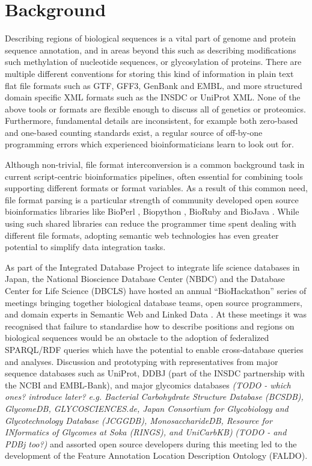 \section*{Background}
Describing regions of biological sequences is a vital part of genome and protein sequence
annotation, and in areas beyond this such as describing modifications such methylation
of nucleotide sequences, or glycosylation of proteins.
There are multiple different conventions for storing this kind of information in
plain text flat file formats such as GTF, GFF3, GenBank and EMBL,
and more structured domain specific XML formats such as the INSDC or UniProt XML.
None of the above tools or formats are flexible enough to discuss all of genetics or proteomics. 
Furthermore, fundamental details are inconsistent, for example both zero-based and
one-based counting standards exist, a regular source of off-by-one programming
errors which experienced bioinformaticians learn to look out for.

Although non-trivial, file format interconversion is a common background task
in current script-centric bioinformatics pipelines, often essential for combining
tools supporting different formats or format variables.
As a result of this common need, file format parsing is a particular strength of
community developed open source bioinformatics libraries like BioPerl
\cite{BioPerl2002}, Biopython \cite{Biopython2009}, BioRuby \cite{BioRuby2010}
and BioJava \cite{BioJava2012}. While using such shared libraries can reduce the
programmer time spent dealing with different file formats, adopting semantic
web technologies has even greater potential to simplify data integration tasks.

As part of the Integrated Database Project to integrate life science databases in
Japan, the National Bioscience Database Center (NBDC) and the Database
Center for Life Science (DBCLS) have hosted an annual ``BioHackathon'' series
of meetings bringing together biological database teams, open source programmers,
and domain experts in Semantic Web and Linked Data \cite{BioHack2010,BioHack2011and2012}.
At these meetings it was recognised that failure to standardise how to describe positions
and regions on biological sequences would be an obstacle to the adoption of federalized
SPARQL/RDF queries which have the potential to enable cross-database queries and
analyses. Discussion and prototyping with representatives from major sequence databases
such as UniProt, DDBJ (part of the INSDC partnership with the NCBI and EMBL-Bank),
and major glycomics databases \textit{(TODO - which ones? introduce later? e.g.
 Bacterial Carbohydrate Structure Database (BCSDB), GlycomeDB,
 GLYCOSCIENCES.de,
 Japan Consortium for Glycobiology and Glycotechnology Database (JCGGDB),
 MonosaccharideDB,
 Resource for INformatics of Glycomes at Soka (RINGS),
 and UniCarbKB)}
\textit{(TODO - and PDBj too?)} and assorted open source developers during this meeting
led to the development of the Feature Annotation Location Description Ontology (FALDO).

